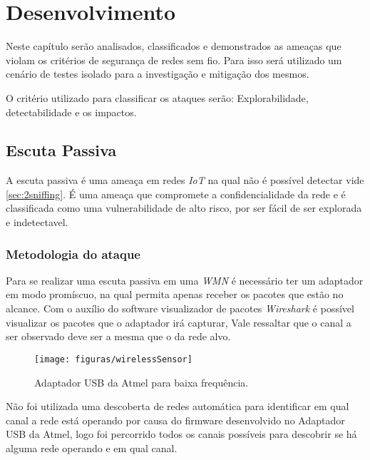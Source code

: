 	\newpage
\chapter{Desenvolvimento}
\label{ch:desenvolvimento}
\par Neste capítulo serão analisados, classificados e demonstrados as ameaças que violam os critérios de segurança de redes sem fio. Para isso será utilizado um cenário de testes isolado para a investigação e mitigação dos mesmos.
\par O crit\'erio utilizado para classificar os ataques ser\~ao: Explorabilidade, detectabilidade e os impactos.

\section{Escuta Passiva}
\label{sec:3sniffer} 
\par A escuta passiva é uma ameaça em redes \emph{IoT} na qual não é possível detectar vide \autoref{sec:2sniffing}. \'E uma amea\c{c}a que compromete a confidencialidade da rede e \'e classificada como uma vulnerabilidade de alto risco, por ser f\'acil de ser explorada e indetectavel.

\subsection{Metodologia do ataque}
\par Para se realizar uma escuta passiva em uma \emph{WMN} é necessário ter um adaptador em modo prom\'iscuo, na qual permita apenas receber os pacotes que est\~ao no alcance. Com o aux\'ilio do software visualizador de pacotes \emph{Wireshark} é possível visualizar os pacotes que o adaptador irá capturar, Vale ressaltar que o canal a ser observado deve ser a mesma que o da rede alvo.

\begin{figure}[ht]
	\centering
	\caption{Adaptador USB da Atmel para baixa frequência.}
    \texttt{[image: figuras/wirelessSensor]}
    \label{fig:usbAdapter}
\end{figure}

\par Não foi utilizada uma descoberta de redes automática para identificar em qual canal a rede está operando por causa do firmware desenvolvido no Adaptador USB da Atmel, logo foi percorrido todos os canais possíveis para descobrir se há alguma rede operando e em qual canal.

